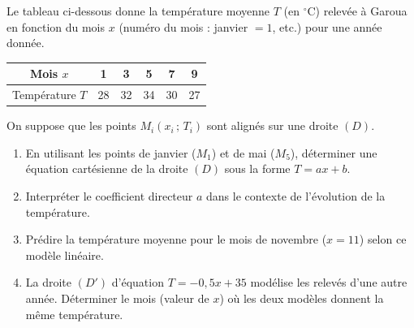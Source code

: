\documentclass[11pt]{article}
\begin{document}
\begin{exercice}
Le tableau ci-dessous donne la température moyenne $T$ (en $^\circ\text{C}$) relevée à Garoua en fonction du mois $x$ (numéro du mois : janvier $=1$, etc.) pour une année donnée.

\begin{center}
\begin{tabular}{|c|c|c|c|c|c|}
\hline
Mois $x$ & 1 & 3 & 5 & 7 & 9 \\
\hline
Température $T$ & 28 & 32 & 34 & 30 & 27 \\
\hline
\end{tabular}
\end{center}
On suppose que les points $M_i(x_i\,;\,T_i)$ sont alignés sur une droite $(D)$.
\begin{enumerate}
    \item En utilisant les points de janvier ($M_1$) et de mai ($M_5$), déterminer une équation cartésienne de la droite $(D)$ sous la forme $T = ax + b$.
    \item Interpréter le coefficient directeur $a$ dans le contexte de l'évolution de la température.
    \item Prédire la température moyenne pour le mois de novembre ($x=11$) selon ce modèle linéaire.
    \item La droite $(D')$ d'équation $T = -0,5x + 35$ modélise les relevés d'une autre année. Déterminer le mois (valeur de $x$) où les deux modèles donnent la même température.
\end{enumerate}
\end{exercice}
\end{document}
